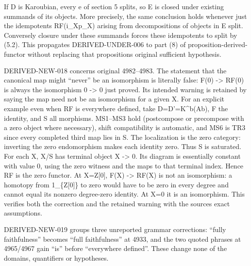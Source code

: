 \documentclass[11pt]{article}
\begin{document}
If D\textquotesingle{} is Karoubian,\allowbreak{} every e of section 5 splits,\allowbreak{} so E is closed under existing summands of its objects. More precisely,\allowbreak{} the same conclusion holds whenever just the idempotents RF(i\_\allowbreak{}Xp\_\allowbreak{}X)\allowbreak{} arising from decompositions of objects in E split. Conversely closure under these summands forces these idempotents to split by (5.2)\allowbreak{}. This propagates DERIVED-UNDER-006 to part (8)\allowbreak{} of proposition-derived-functor without replacing that proposition\textquotesingle s original sufficient hypothesis.

DERIVED-NEW-018 concerns original 4982–\allowbreak{}4983. The statement that the canonical map might ``never'' be an isomorphism is literally false:\allowbreak{} F(0)\allowbreak{} \allowbreak{}-> RF(0)\allowbreak{} is always the isomorphism 0 \allowbreak{}-> 0 just proved. Its intended warning is retained by saying the map need not be an isomorphism for a given X. For an explicit example even when RF is everywhere defined,\allowbreak{} take D\allowbreak{}=D'\allowbreak{}=K\textasciicircum{}b(Ab)\allowbreak{},\allowbreak{} F the identity,\allowbreak{} and S all morphisms. MS1–\allowbreak{}MS3 hold (postcompose or precompose with a zero object where necessary)\allowbreak{},\allowbreak{} shift compatibility is automatic,\allowbreak{} and MS6 is TR3 since every completed third map lies in S. The localization is the zero category:\allowbreak{} inverting the zero endomorphism makes each identity zero. Thus S is saturated. For each X,\allowbreak{} X/\allowbreak{}S has terminal object X \allowbreak{}-> 0. Its diagram is essentially constant with value 0,\allowbreak{} using the zero witness and the maps to that terminal index. Hence RF is the zero functor. At X\allowbreak{}=Z[0]\allowbreak{},\allowbreak{} F(X)\allowbreak{} \allowbreak{}-> RF(X)\allowbreak{} is not an isomorphism:\allowbreak{} a homotopy from 1\_\allowbreak{}\{Z[0]\allowbreak{}\} to zero would have to be zero in every degree and cannot equal its nonzero degree-zero identity. At X\allowbreak{}=0 it is an isomorphism. This verifies both the correction and the retained warning with the source\textquotesingle s exact assumptions.

DERIVED-NEW-019 groups three unreported grammar corrections:\allowbreak{} ``fully faithfulness'' becomes ``full faithfulness'' at 4933,\allowbreak{} and the two quoted phrases at 4965/\allowbreak{}4967 gain ``is'' before ``everywhere defined''. These change none of the domains,\allowbreak{} quantifiers or hypotheses.
\end{document}
